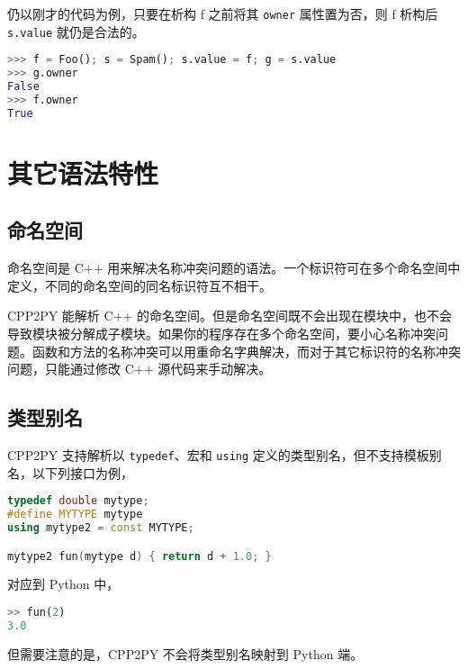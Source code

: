 仍以刚才的代码为例，只要在析构 f 之前将其 \lstinline{owner} 属性置为否，则 f 析构后 \lstinline{s.value} 就仍是合法的。

\begin{framed}
\begin{lstlisting}[language=python]
>>> f = Foo(); s = Spam(); s.value = f; g = s.value
>>> g.owner
False
>>> f.owner
True
\end{lstlisting}
\end{framed}

\section{其它语法特性}

\subsection{命名空间}

命名空间是 C++ 用来解决名称冲突问题的语法。一个标识符可在多个命名空间中定义，不同的命名空间的同名标识符互不相干。

CPP2PY 能解析 C++ 的命名空间。但是命名空间既不会出现在模块中，也不会导致模块被分解成子模块。如果你的程序存在多个命名空间，要小心名称冲突问题。函数和方法的名称冲突可以用重命名字典解决，而对于其它标识符的名称冲突问题，只能通过修改 C++ 源代码来手动解决。

\subsection{类型别名}

CPP2PY 支持解析以 \lstinline{typedef}、宏和 \lstinline{using} 定义的类型别名，但不支持模板别名，以下列接口为例，

\begin{framed}
\begin{lstlisting}[language=c++]
typedef double mytype;
#define MYTYPE mytype
using mytype2 = const MYTYPE;

mytype2 fun(mytype d) { return d + 1.0; }
\end{lstlisting}
\end{framed}

对应到 Python 中，

\begin{framed}
\begin{lstlisting}[language=python]
>> fun(2)
3.0
\end{lstlisting}
\end{framed}


但需要注意的是，CPP2PY 不会将类型别名映射到 Python 端。

